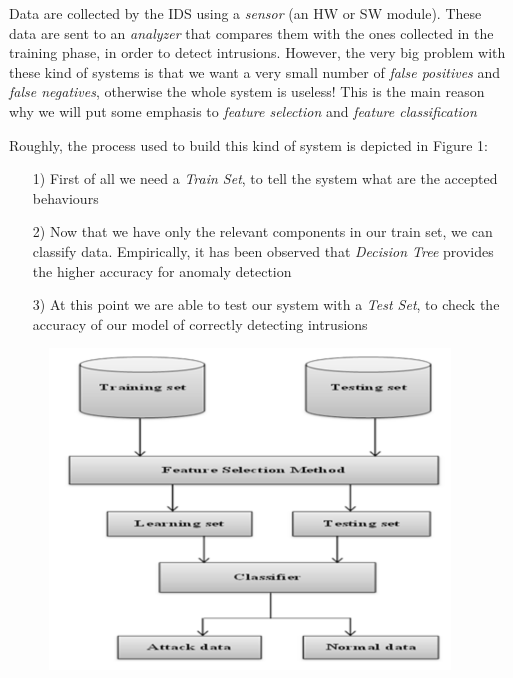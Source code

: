 Data are collected by the IDS using a \emph{sensor} (an HW or SW module). These data are sent to an \emph{analyzer} that compares them with the ones collected in the training phase, in order to detect intrusions. However, the very big problem with these kind of systems is that we want a very small number of \emph{false positives} and \emph{false negatives}, otherwise the whole system is useless!\newline\newline
This is the main reason why we will put some emphasis to \emph{feature selection} and \emph{feature classification}\newline\newline

Roughly, the process used to build this kind of system is depicted in Figure 1:
	\begin{itemize}
		\item[1)] First of all we need a \emph{Train Set}, to tell the system what are the accepted behaviours
		\item[2)] Now that we have only the relevant components in our train set, we can classify data. Empirically, it has been observed that \emph{Decision Tree} provides the higher accuracy for anomaly detection
		\item[3)] At this point we are able to test our system with a \emph{Test Set}, to check the accuracy of our model of correctly detecting intrusions
	\end{itemize}
	
	\begin{figure}[h!]
		\centering
		\includegraphics[width=\textwidth,height=8.5cm]{img/IDSPhases.png}
	\end{figure}